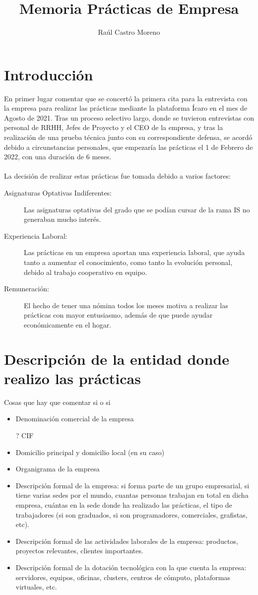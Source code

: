 \documentclass{article}
\title{Memoria Prácticas de Empresa}
\author{Raúl Castro Moreno}
\date{}
\begin{document}
\maketitle
\tableofcontents


\section{Introducción}
En primer lugar comentar que se concertó la primera cita para la entrevista con la empresa para realizar las prácticas mediante la plataforma Ícaro en el mes de Agosto de 2021. Tras un proceso selectivo largo, donde se tuvieron entrevistas con personal de RRHH, Jefes de Proyecto y el CEO de la empresa, y tras la realización de una prueba técnica junto con su correspondiente defensa, se acordó debido a circunstancias personales, que empezaría las prácticas el 1 de Febrero de 2022, con una duración de 6 meses.\\\\
La decisión de realizar estas prácticas fue tomada debido a varios factores:
\begin{description}
    \item[Asignaturas Optativas Indiferentes:] Las asignaturas optativas del grado que se podían cursar de la rama IS no generaban mucho interés.
    \item[Experiencia Laboral:] Las prácticas en un empresa aportan una experiencia laboral, que ayuda tanto a aumentar el conocimiento, como tanto la evolución personal, debido al trabajo cooperativo en equipo.
    \item[Remuneración:] El hecho de tener una nómina todos los meses motiva a realizar las prácticas con mayor entusiasmo, además de que puede ayudar económicamente en el hogar. 
\end{description}

\section{Descripción de la entidad donde realizo las prácticas}
Cosas que hay que comentar si o si
\begin{itemize}
    \item Denominación comercial de la empresa
    \item[?] CIF
    \item Domicilio principal y domicilio local (en su caso)
    \item Organigrama de la empresa
    \item Descripción formal de la empresa: si forma parte de un grupo empresarial, si tiene varias sedes por el mundo, cuantas personas trabajan en total en dicha empresa, cuántas en la sede donde ha realizado las prácticas, el tipo de trabajadores (si son graduados, si son programadores, comerciales, grafistas, etc).
    \item Descripción formal de las actividades laborales de la empresa: productos, proyectos relevantes, clientes importantes.
    \item Descripción formal de la dotación tecnológica con la que cuenta la empresa: servidores, equipos, oficinas, clusters, centros de cómputo, plataformas virtuales, etc.
\end{itemize}
\end{document}

